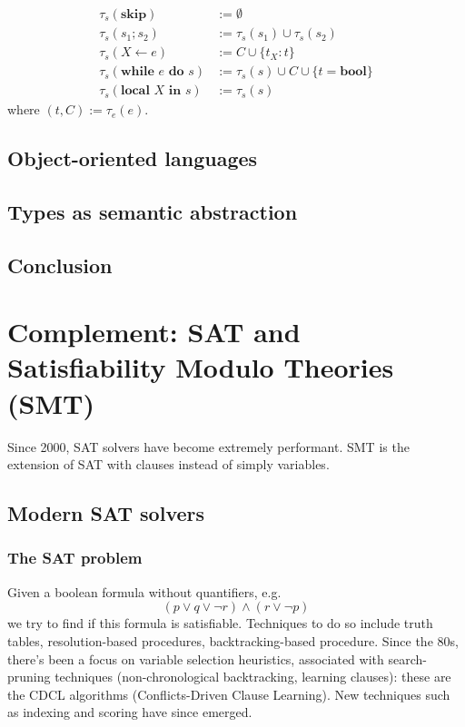 \documentclass[toc, titlepaged]{../cs-classes/cs-classes}
\begin{document}
\begin{equation*}
    \begin{aligned}
        \tau_s(\textbf{skip}) &:= \emptyset\\
        \tau_s(s_1;s_2) &:= \tau_s(s_1) \cup \tau_s(s_2)\\
        \tau_s(X\leftarrow e) &:= C\cup\{t_X:t\}\\
        \tau_s(\textbf{while } e \textbf{ do } s) &:= \tau_s(s) \cup C \cup \{t=\textbf{bool}\}\\
        \tau_s(\textbf{local } X \textbf{ in } s) &:= \tau_s(s)
    \end{aligned}
\end{equation*}
where $(t, C) := \tau_e(e)$.

\subsection{Object-oriented languages}

\subsection{Types as semantic abstraction}

\subsection*{Conclusion}

\newpage
\section{Complement: SAT and Satisfiability Modulo Theories (SMT)}
Since 2000, SAT solvers have become extremely performant. SMT is the extension of SAT with clauses instead of simply variables.
\subsection{Modern SAT solvers}
\subsubsection{The SAT problem}
Given a boolean formula without quantifiers, e.g.
\begin{equation*}
    (p\lor q\lor \lnot r)\land(r\lor \lnot p)
\end{equation*}
we try to find if this formula is satisfiable. Techniques to do so include truth tables, resolution-based procedures, backtracking-based procedure. Since the 80s, there's been a focus on variable selection heuristics, associated with search-pruning techniques (non-chronological backtracking, learning clauses): these are the CDCL algorithms (Conflicts-Driven Clause Learning). New techniques such as indexing and scoring have since emerged.
\end{document}
